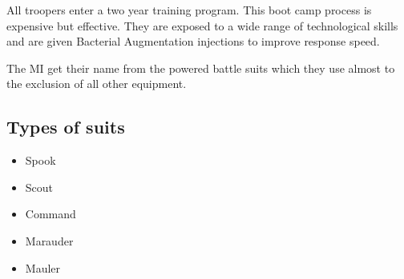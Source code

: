 All troopers enter a two year training program. This boot camp 
process is expensive but effective. They are exposed to a wide range 
of technological skills and are given Bacterial Augmentation 
injections to improve response speed. 

The MI get their name from the powered battle suits which they use almost
to the exclusion of all other equipment. 

\subsection{Types of suits}

\begin{itemize}
	\item Spook
	\item Scout
	\item Command
	\item Marauder
	\item Mauler
\end{itemize}


